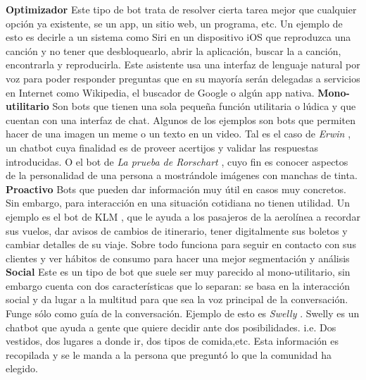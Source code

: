 \textbf{Optimizador}
Este tipo de bot trata de resolver cierta tarea mejor que cualquier opción ya existente, se un app, un sitio web, un programa, etc. 
Un ejemplo de esto es decirle a un sistema como Siri en un dispositivo iOS que reproduzca una canción y no tener que desbloquearlo, abrir la aplicación, buscar la a canción, encontrarla y reproducirla. Este asistente usa una interfaz de lenguaje natural por voz para poder responder preguntas que en su mayoría serán delegadas a servicios en Internet como Wikipedia, el buscador de Google o algún app nativa.
\textbf{Mono-utilitario}
Son bots que tienen una sola pequeña función utilitaria o lúdica y que cuentan con una interfaz de chat. Algunos de los ejemplos son bots que permiten hacer de una imagen un meme o un texto en un video.
Tal es el caso de \textit{Erwin} \cite{niefelderwin2017}, un chatbot cuya finalidad es de proveer acertijos y validar las respuestas introducidas. O el bot de \textit{La prueba de Rorschart} \cite{niefeldrorschach2017}, cuyo fin es conocer aspectos de la personalidad de una persona a mostrándole imágenes con manchas de tinta.
\textbf{Proactivo}
Bots que pueden dar información muy útil en casos muy concretos. Sin embargo, para interacción en una situación cotidiana no tienen utilidad. 
Un ejemplo es el bot de KLM \cite{klm2016messenger}, que le ayuda a los pasajeros de la aerolínea a recordar sus vuelos, dar avisos de cambios de itinerario, tener digitalmente sus boletos y cambiar detalles de su viaje. Sobre todo funciona para seguir en contacto con sus clientes y ver hábitos de consumo para hacer una mejor segmentación y análisis
\textbf{Social}
Este es un tipo de bot que suele ser muy parecido al mono-utilitario, sin embargo cuenta con dos características que lo separan: se basa en la interacción social y da lugar a la multitud para que sea la voz principal de la conversación. Funge sólo como guía de la conversación. Ejemplo de esto es \textit{Swelly} \cite{swelly2017messenger}. 
Swelly es un chatbot que ayuda a gente que quiere decidir ante dos posibilidades. i.e. Dos vestidos, dos lugares a donde ir, dos tipos de comida,etc. Esta información es recopilada y se le manda a la persona que preguntó lo que la comunidad ha elegido.


